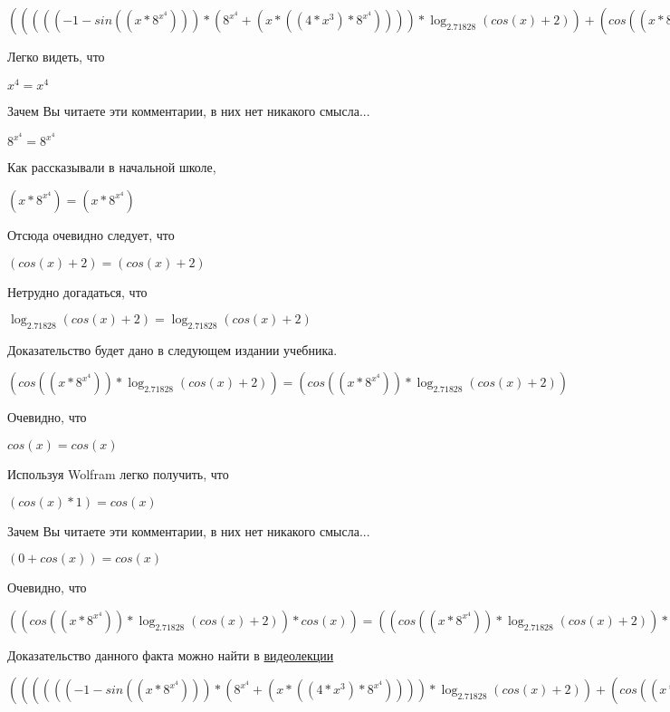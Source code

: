 \documentclass[12pt,a4paper,fleqn]{article}
\theoremstyle{definition}
\begin{document}
$((((( -1  - sin(( x  * { 8 }^{{ x }^{ 4 }}))) * ({ 8 }^{{ x }^{ 4 }} + ( x  * (( 4  * { x }^{ 3 }) * { 8 }^{{ x }^{ 4 }})))) * \log_{ 2.71828 }{(cos( x ) +  2 )}) + (cos(( x  * { 8 }^{{ x }^{ 4 }})) * \frac{( -1  - sin( x ))}{(cos( x ) +  2 )}
)) * ( 1  + sin( x ))) = ((((( -1  - sin(( x  * { 8 }^{{ x }^{ 4 }}))) * ({ 8 }^{{ x }^{ 4 }} + ( x  * (( 4  * { x }^{ 3 }) * { 8 }^{{ x }^{ 4 }})))) * \log_{ 2.71828 }{(cos( x ) +  2 )}) + (cos(( x  * { 8 }^{{ x }^{ 4 }})) * \frac{( -1  - sin( x ))}{(cos( x ) +  2 )}
)) * ( 1  + sin( x )))$

Легко видеть, что

${ x }^{ 4 } = { x }^{ 4 }$

Зачем Вы читаете эти комментарии, в них нет никакого смысла...

${ 8 }^{{ x }^{ 4 }} = { 8 }^{{ x }^{ 4 }}$

Как рассказывали в начальной школе,

$( x  * { 8 }^{{ x }^{ 4 }}) = ( x  * { 8 }^{{ x }^{ 4 }})$

Отсюда очевидно следует, что

$(cos( x ) +  2 ) = (cos( x ) +  2 )$

Нетрудно догадаться, что

$\log_{ 2.71828 }{(cos( x ) +  2 )} = \log_{ 2.71828 }{(cos( x ) +  2 )}$

Доказательство будет дано в следующем издании учебника.

$(cos(( x  * { 8 }^{{ x }^{ 4 }})) * \log_{ 2.71828 }{(cos( x ) +  2 )}) = (cos(( x  * { 8 }^{{ x }^{ 4 }})) * \log_{ 2.71828 }{(cos( x ) +  2 )})$

Очевидно, что

$cos( x ) = cos( x )$

Используя Wolfram легко получить, что

$(cos( x ) *  1 ) = cos( x )$

Зачем Вы читаете эти комментарии, в них нет никакого смысла...

$( 0  + cos( x )) = cos( x )$

Очевидно, что

$((cos(( x  * { 8 }^{{ x }^{ 4 }})) * \log_{ 2.71828 }{(cos( x ) +  2 )}) * cos( x )) = ((cos(( x  * { 8 }^{{ x }^{ 4 }})) * \log_{ 2.71828 }{(cos( x ) +  2 )}) * cos( x ))$

Доказательство данного факта можно найти в \href{https://www.youtube.com/watch?v=dQw4w9WgXcQ}{видеолекции}

$(((((( -1  - sin(( x  * { 8 }^{{ x }^{ 4 }}))) * ({ 8 }^{{ x }^{ 4 }} + ( x  * (( 4  * { x }^{ 3 }) * { 8 }^{{ x }^{ 4 }})))) * \log_{ 2.71828 }{(cos( x ) +  2 )}) + (cos(( x  * { 8 }^{{ x }^{ 4 }})) * \frac{( -1  - sin( x ))}{(cos( x ) +  2 )}
)) * ( 1  + sin( x ))) - ((cos(( x  * { 8 }^{{ x }^{ 4 }})) * \log_{ 2.71828 }{(cos( x ) +  2 )}) * cos( x ))) = (((((( -1  - sin(( x  * { 8 }^{{ x }^{ 4 }}))) * ({ 8 }^{{ x }^{ 4 }} + ( x  * (( 4  * { x }^{ 3 }) * { 8 }^{{ x }^{ 4 }})))) * \log_{ 2.71828 }{(cos( x ) +  2 )}) + (cos(( x  * { 8 }^{{ x }^{ 4 }})) * \frac{( -1  - sin( x ))}{(cos( x ) +  2 )}
)) * ( 1  + sin( x ))) - ((cos(( x  * { 8 }^{{ x }^{ 4 }})) * \log_{ 2.71828 }{(cos( x ) +  2 )}) * cos( x )))$
\end{document}
